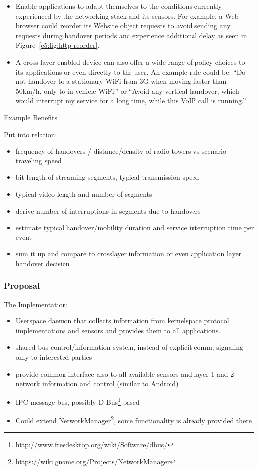 \begin{itemize}
	\item Enable applications to adapt themselves to the conditions currently experienced by the networking stack and its sensors. For example, a Web browser could reorder its Website object requests to avoid sending any requests during handover periods and experience additional delay as seen in Figure~\ref{c5:fig:http-reorder}.

	\item A cross-layer enabled device can also offer a wide range of policy choices to its applications or even directly to the user. An example rule could be: ``Do not handover to a stationary WiFi from 3G when moving faster than 50km/h, only to in-vehicle WiFi.'' or ``Avoid any vertical handover, which would interrupt my service for a long time, while this VoIP call is running.''

\end{itemize}

Example Benefits

Put into relation:

\begin{itemize}
	\item frequency of handovers / distance/density of radio towers vs scenario traveling speed
	\item bit-length of streaming segments, typical transmission speed
	\item typical video length and number of segments
	\item derive number of interruptions in segments due to handovers
	\item estimate typical handover/mobility duration and service interruption time per event
	\item sum it up and compare to crosslayer information or even application layer handover decision
\end{itemize}


\subsubsection{Proposal}

The Implementation:
\begin{itemize}
	\item Userspace daemon that collects information from kernelspace protocol implementations and sensors and provides them to all applications.
	\item shared bus control/information system, instead of explicit comm; signaling only to interested parties
	\item provide common interface also to all available sensors and layer 1 and 2 network information and control (similar to Android)
	\item IPC message bus, possibly D-Bus\footnote{\url{http://www.freedesktop.org/wiki/Software/dbus/}} based
	\item Could extend NetworkManager\footnote{\url{https://wiki.gnome.org/Projects/NetworkManager}}, some functionality is already provided there

\end{itemize}

